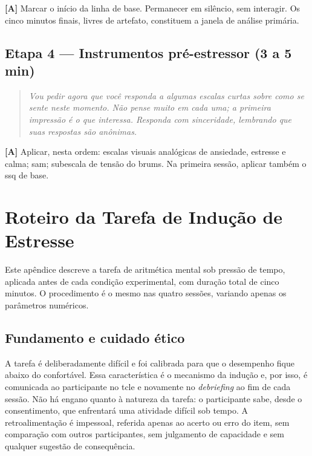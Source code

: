 \noindent\textbf{[A]} Marcar o início da linha de base. Permanecer em silêncio, sem interagir. Os cinco minutos finais, livres de artefato, constituem a janela de análise primária.

\section*{Etapa 4 --- Instrumentos pré-estressor (3 a 5 min)}

\begin{quote}\itshape
Vou pedir agora que você responda a algumas escalas curtas sobre como se sente \emph{neste momento}. Não pense muito em cada uma; a primeira impressão é o que interessa. Responda com sinceridade, lembrando que suas respostas são anônimas.
\end{quote}

\noindent\textbf{[A]} Aplicar, nesta ordem: escalas visuais analógicas de ansiedade, estresse e calma; \gls{sam}; subescala de tensão do \gls{brums}. Na primeira sessão, aplicar também o \gls{ssq} de base.

\chapter{Roteiro da Tarefa de Indução de Estresse}\label{ap:estressor}

Este apêndice descreve a tarefa de aritmética mental sob pressão de tempo, aplicada antes de cada condição experimental, com duração total de cinco minutos. O procedimento é o mesmo nas quatro sessões, variando apenas os parâmetros numéricos.

\section*{Fundamento e cuidado ético}

A tarefa é deliberadamente difícil e foi calibrada para que o desempenho fique abaixo do confortável. Essa característica é o mecanismo da indução e, por isso, é comunicada ao participante no \gls{tcle} e novamente no \textit{debriefing} ao fim de cada sessão. Não há engano quanto à natureza da tarefa: o participante sabe, desde o consentimento, que enfrentará uma atividade difícil sob tempo. A retroalimentação é impessoal, referida apenas ao acerto ou erro do item, sem comparação com outros participantes, sem julgamento de capacidade e sem qualquer sugestão de consequência.

